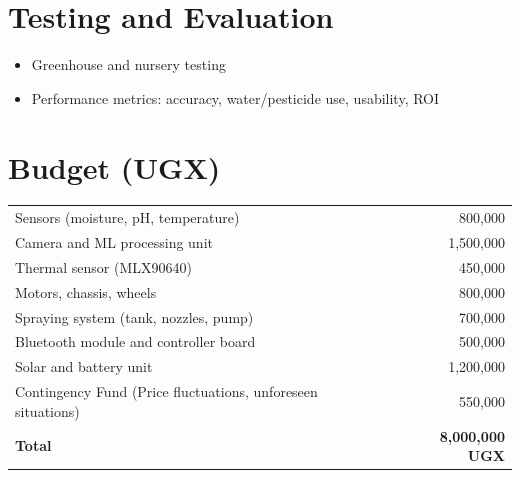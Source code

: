 \documentclass[12pt,a4paper]{report}
\begin{document}
\section{Testing and Evaluation}
\begin{itemize}
    \item Greenhouse and nursery testing
    \item Performance metrics: accuracy, water/pesticide use, usability, ROI
\end{itemize}

\section{Budget (UGX)}
\begin{tabular}{lr}
\toprule
Sensors (moisture, pH, temperature) & 800,000 \\
Camera and ML processing unit & 1,500,000 \\
Thermal sensor (MLX90640) & 450,000 \\
Motors, chassis, wheels & 800,000 \\
Spraying system (tank, nozzles, pump) & 700,000 \\
Bluetooth module and controller board & 500,000 \\
Solar and battery unit & 1,200,000 \\
Contingency Fund (Price fluctuations, unforeseen situations) & 550,000 \\
\midrule
\textbf{Total} & \textbf{8,000,000 UGX} \\
\bottomrule
\end{tabular}
\vspace{2cm}
\end{document}
